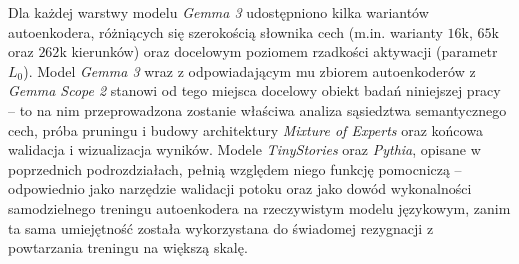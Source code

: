   Dla każdej warstwy modelu \textit{Gemma 3} udostępniono kilka wariantów autoenkodera, różniących się szerokością słownika cech (m.in. warianty $16$k, $65$k oraz $262$k kierunków) oraz docelowym poziomem rzadkości aktywacji (parametr $L_0$). %
  \newline
  Model \textit{Gemma 3} wraz z odpowiadającym mu zbiorem autoenkoderów z \textit{Gemma Scope 2} stanowi od tego miejsca docelowy obiekt badań niniejszej pracy -- to na nim przeprowadzona zostanie właściwa analiza sąsiedztwa semantycznego cech, próba pruningu i budowy architektury \textit{Mixture of Experts} oraz końcowa walidacja i wizualizacja wyników. Modele \textit{TinyStories} oraz \textit{Pythia}, opisane w poprzednich podrozdziałach, pełnią względem niego funkcję pomocniczą -- odpowiednio jako narzędzie walidacji potoku oraz jako dowód wykonalności samodzielnego treningu autoenkodera na rzeczywistym modelu językowym, zanim ta sama umiejętność została wykorzystana do świadomej rezygnacji z powtarzania treningu na większą skalę.

